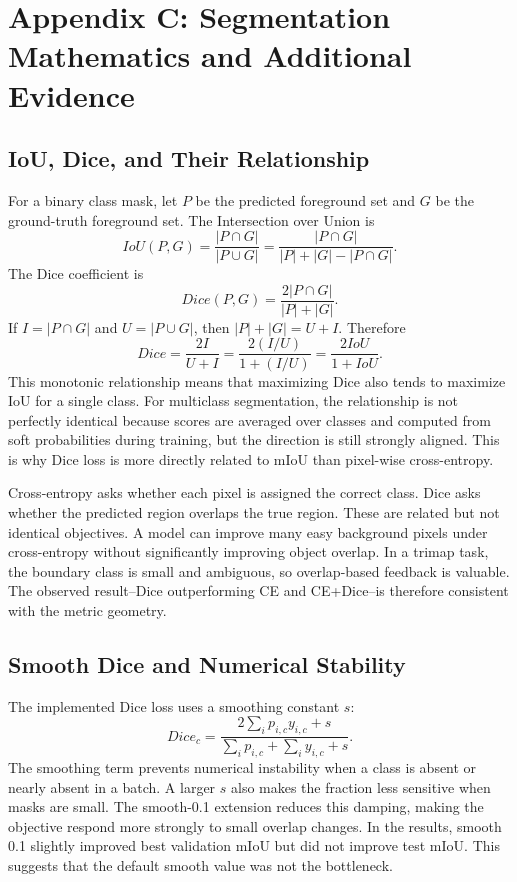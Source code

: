 \documentclass[10pt,twocolumn]{article}
\begin{document}
\section{Appendix C: Segmentation Mathematics and Additional Evidence}

\subsection{IoU, Dice, and Their Relationship}

For a binary class mask, let $P$ be the predicted foreground set and $G$ be the ground-truth foreground set. The Intersection over Union is
\begin{equation}
IoU(P,G)=\frac{|P\cap G|}{|P\cup G|}
=\frac{|P\cap G|}{|P|+|G|-|P\cap G|}.
\end{equation}
The Dice coefficient is
\begin{equation}
Dice(P,G)=\frac{2|P\cap G|}{|P|+|G|}.
\end{equation}
If $I=|P\cap G|$ and $U=|P\cup G|$, then $|P|+|G|=U+I$. Therefore
\begin{equation}
Dice=\frac{2I}{U+I}
=\frac{2(I/U)}{1+(I/U)}
=\frac{2IoU}{1+IoU}.
\end{equation}
This monotonic relationship means that maximizing Dice also tends to maximize IoU for a single class. For multiclass segmentation, the relationship is not perfectly identical because scores are averaged over classes and computed from soft probabilities during training, but the direction is still strongly aligned. This is why Dice loss is more directly related to mIoU than pixel-wise cross-entropy.

Cross-entropy asks whether each pixel is assigned the correct class. Dice asks whether the predicted region overlaps the true region. These are related but not identical objectives. A model can improve many easy background pixels under cross-entropy without significantly improving object overlap. In a trimap task, the boundary class is small and ambiguous, so overlap-based feedback is valuable. The observed result--Dice outperforming CE and CE+Dice--is therefore consistent with the metric geometry.

\subsection{Smooth Dice and Numerical Stability}

The implemented Dice loss uses a smoothing constant $s$:
\begin{equation}
Dice_c=\frac{2\sum_i p_{i,c}y_{i,c}+s}{\sum_i p_{i,c}+\sum_i y_{i,c}+s}.
\end{equation}
The smoothing term prevents numerical instability when a class is absent or nearly absent in a batch. A larger $s$ also makes the fraction less sensitive when masks are small. The smooth-0.1 extension reduces this damping, making the objective respond more strongly to small overlap changes. In the results, smooth 0.1 slightly improved best validation mIoU but did not improve test mIoU. This suggests that the default smooth value was not the bottleneck.
\end{document}
